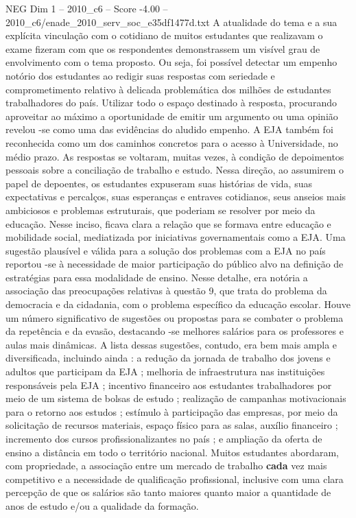 \begin{textsample}{NEG Dim 1 – 2010\_c6 – Score -4.00 – 2010\_c6/enade\_2010\_serv\_soc\_e35df1477d.txt}
A atualidade do tema e a sua explícita vinculação com o cotidiano de muitos estudantes que realizavam o exame fizeram com que os respondentes demonstrassem um visível grau de envolvimento com o tema proposto.
Ou seja, foi possível detectar um empenho notório dos estudantes ao redigir suas respostas com seriedade e comprometimento relativo à delicada problemática dos milhões de estudantes trabalhadores do país.
Utilizar todo o espaço destinado à resposta, procurando aproveitar ao máximo a oportunidade de emitir um argumento ou uma opinião revelou -se como uma das evidências do aludido empenho.
A EJA também foi reconhecida como um dos caminhos concretos para o acesso à Universidade, no médio prazo.
As respostas se voltaram, muitas vezes, à condição de depoimentos pessoais sobre a conciliação de trabalho e estudo.
Nessa direção, ao assumirem o papel de depoentes, os estudantes expuseram suas histórias de vida, suas expectativas e percalços, suas esperanças e entraves cotidianos, seus anseios mais ambiciosos e problemas estruturais, que poderiam se resolver por meio da educação.
Nesse inciso, ficava clara a relação que se formava entre educação e mobilidade social, mediatizada por iniciativas governamentais como a EJA.
Uma sugestão plausível e válida para a solução dos problemas com a EJA no país reportou -se à necessidade de maior participação do público alvo na definição de estratégias para essa modalidade de ensino.
Nesse detalhe, era notória a associação das preocupações relativas à questão 9, que trata do problema da democracia e da cidadania, com o problema específico da educação escolar.
Houve um número significativo de sugestões ou propostas para se combater o problema da repetência e da evasão, destacando -se melhores salários para os professores e aulas mais dinâmicas.
A lista dessas sugestões, contudo, era bem mais ampla e diversificada, incluindo ainda : a redução da jornada de trabalho dos jovens e adultos que participam da EJA ; melhoria de infraestrutura nas instituições responsáveis pela EJA ; incentivo financeiro aos estudantes trabalhadores por meio de um sistema de bolsas de estudo ; realização de campanhas motivacionais para o retorno aos estudos ; estímulo à participação das empresas, por meio da solicitação de recursos materiais, espaço físico para as salas, auxílio financeiro ; incremento dos cursos profissionalizantes no país ; e ampliação da oferta de ensino a distância em todo o território nacional.
Muitos estudantes abordaram, com propriedade, a associação entre um mercado de trabalho \textbf{cada} vez mais competitivo e a necessidade de qualificação profissional, inclusive com uma clara percepção de que os salários são tanto maiores quanto maior a quantidade de anos de estudo e/ou a qualidade da formação.

\end{textsample}
